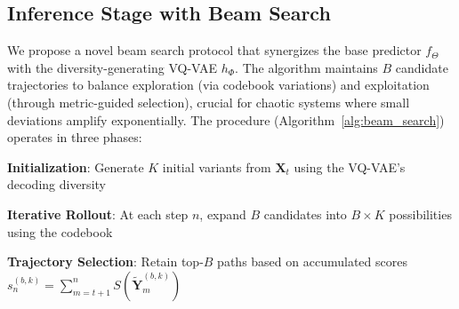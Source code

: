 


\subsection{Inference Stage with Beam Search}
We propose a novel beam search protocol that synergizes the base predictor $f_\Theta$ with the diversity-generating VQ-VAE $h_\Phi$. The algorithm maintains $B$ candidate trajectories to balance exploration (via codebook variations) and exploitation (through metric-guided selection), crucial for chaotic systems where small deviations amplify exponentially. The procedure (Algorithm~\ref{alg:beam_search}) operates in three phases:


\textbf{Initialization}: Generate $K$ initial variants from $\mathbf{X}_t$ using the VQ-VAE's decoding diversity

\textbf{Iterative Rollout}: At each step $n$, expand $B$ candidates into $B\times K$ possibilities using the codebook

\textbf{Trajectory Selection}: Retain top-$B$ paths based on accumulated scores $s_n^{(b,k)} = \sum_{m=t+1}^n S(\tilde{\mathbf{Y}}_m^{(b,k)})$


